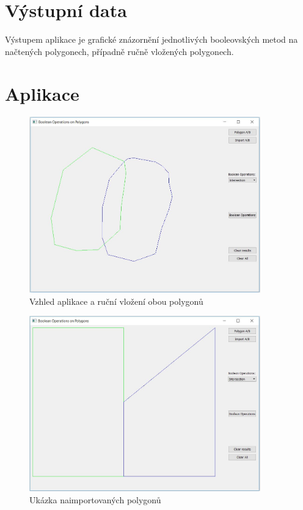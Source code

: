 \documentclass[a4paper, 12pt]{article}
\begin{document}
\section{Výstupní data}
Výstupem aplikace je grafické znázornění jednotlivých booleovských metod na načtených polygonech, případně ručně vložených polygonech.


\clearpage
\section{Aplikace}

\begin{figure}[h!]
\centering
\includegraphics[width=10cm]{pictures/polygons.jpg}
\caption{Vzhled aplikace a ruční vložení obou polygonů}
\end{figure}

\begin{figure}[h!]
\centering
\includegraphics[width=10cm]{pictures/import.jpg}
\caption{Ukázka naimportovaných polygonů}
\end{figure}
\end{document}

